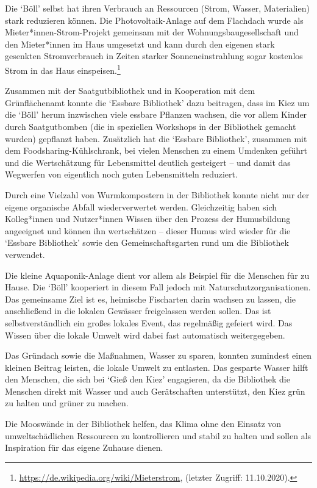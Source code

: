 \documentclass[a4paper,
fontsize=11pt,
oneside,
numbers=noperiodatend,
parskip=half-,
bibliography=totoc,
final
]{scrartcl}
\begin{document}
Die \enquote*{Böll} selbst hat ihren Verbrauch an Ressourcen (Strom,
Wasser, Materialien) stark reduzieren können. Die Photovoltaik-Anlage
auf dem Flachdach wurde als Mieter*innen-Strom-Projekt gemeinsam mit der
Wohnungsbaugesellschaft und den Mieter*innen im Haus umgesetzt und kann
durch den eigenen stark gesenkten Stromverbrauch in Zeiten starker
Sonneneinstrahlung sogar kostenlos Strom in das Haus
einspeisen.\footnote{\url{https://de.wikipedia.org/wiki/Mieterstrom},
  (letzter Zugriff: 11.10.2020).}

Zusammen mit der Saatgutbibliothek und in Kooperation mit dem
Grünflächenamt konnte die \enquote*{Essbare Bibliothek} dazu beitragen,
dass im Kiez um die \enquote*{Böll} herum inzwischen viele essbare
Pflanzen wachsen, die vor allem Kinder durch Saatgutbomben (die in
speziellen Workshops in der Bibliothek gemacht wurden) gepflanzt haben.
Zusätzlich hat die \enquote*{Essbare Bibliothek}, zusammen mit dem
Foodsharing-Kühlschrank, bei vielen Menschen zu einem Umdenken geführt
und die Wertschätzung für Lebensmittel deutlich gesteigert -- und damit
das Wegwerfen von eigentlich noch guten Lebensmitteln reduziert.

Durch eine Vielzahl von Wurmkompostern in der Bibliothek konnte nicht
nur der eigene organische Abfall wiederverwertet werden. Gleichzeitig
haben sich Kolleg*innen und Nutzer*innen Wissen über den Prozess der
Humusbildung angeeignet und können ihn wertschätzen -- dieser Humus wird
wieder für die \enquote*{Essbare Bibliothek} sowie den
Gemeinschaftsgarten rund um die Bibliothek verwendet.

Die kleine Aquaponik-Anlage dient vor allem als Beispiel für die
Menschen für zu Hause. Die \enquote*{Böll} kooperiert in diesem Fall
jedoch mit Naturschutzorganisationen. Das gemeinsame Ziel ist es,
heimische Fischarten darin wachsen zu lassen, die anschließend in die
lokalen Gewässer freigelassen werden sollen. Das ist selbstverständlich
ein großes lokales Event, das regelmäßig gefeiert wird. Das Wissen über
die lokale Umwelt wird dabei fast automatisch weitergegeben.

Das Gründach sowie die Maßnahmen, Wasser zu sparen, konnten zumindest
einen kleinen Beitrag leisten, die lokale Umwelt zu entlasten. Das
gesparte Wasser hilft den Menschen, die sich bei \enquote*{Gieß den
Kiez} engagieren, da die Bibliothek die Menschen direkt mit Wasser und
auch Gerätschaften unterstützt, den Kiez grün zu halten und grüner zu
machen.

Die Mooswände in der Bibliothek helfen, das Klima ohne den Einsatz von
umweltschädlichen Ressourcen zu kontrollieren und stabil zu halten und
sollen als Inspiration für das eigene Zuhause dienen.
\end{document}
